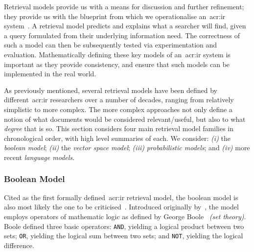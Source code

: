 Retrieval models provide us with a means for discussion and further refinement; they provide us with the blueprint from which we operationalise an~\gls{acr:ir} system~\citep{hiemstra2009ir_models}. A retrieval model predicts and explains what a searcher will find, given a query formulated from their underlying information need. The correctness of such a model can then be subsequently tested via experimentation and evaluation. Mathematically defining these key models of an~\gls{acr:ir} system is important as they provide consistency, and ensure that such models can be implemented in the real world.

As previously mentioned, several retrieval models have been defined by different~\gls{acr:ir} researchers over a number of decades, ranging from relatively simplistic to more complex. The more complex approaches not only define a notion of what documents would be considered relevant/useful, but also to what \emph{degree} that is so. This section considers four main retrieval model families in chronological order, with high level summaries of each. We consider: \emph{(i)} the \emph{boolean model}; \emph{(ii)} the \emph{vector space model}; \emph{(iii)} \emph{probabilistic models}; and \emph{(iv)} more recent \emph{language models.}


\subsubsection{Boolean Model}\label{sec:ir_background:basics:models:boolean}
Cited as the first formally defined~\gls{acr:ir} retrieval model, the boolean model is also most likely the one to be criticised~\citep{hiemstra2009ir_models}. Introduced originally by~\cite{rijsbergen1979ir}, the model employs operators of mathematic logic as defined by George Boole~\citep{boole1847mathematical} \emph{(set theory)}. Boole defined three basic operators: \texttt{AND}, yielding a logical product between two sets; \texttt{OR}, yielding the logical sum between two sets; and \texttt{NOT}, yielding the logical difference.

